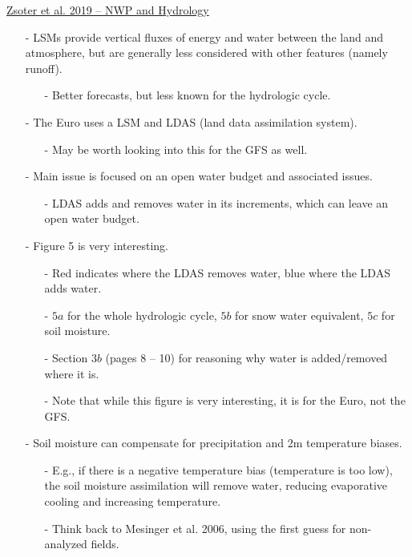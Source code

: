 \documentclass[12pt, letterpaper]{article}
\begin{document}
    \underline{Zsoter et al. 2019 -- NWP and Hydrology}
    \begin{itemize}
    	\item[-] LSMs provide vertical fluxes of energy and water between the land and atmosphere,
    	         but are generally less considered with other features (namely runoff).
    	\begin{itemize}
    		\item[-] Better forecasts, but less known for the hydrologic cycle.
    	\end{itemize}
        \item[-] The Euro uses a LSM and LDAS (land data assimilation system).
        \begin{itemize}
        	\item[-] May be worth looking into this for the GFS as well.
        \end{itemize}
        \item[-] Main issue is focused on an open water budget and associated issues.
        \begin{itemize}
        	\item[-] LDAS adds and removes water in its increments, which can leave an open water budget.
        \end{itemize}
        \item[-] Figure 5 is very interesting.
        \begin{itemize}
        	\item[-] Red indicates where the LDAS removes water, blue where the LDAS adds water.
        	\item[-] $5a$ for the whole hydrologic cycle, $5b$ for snow water equivalent, $5c$ for soil
        	         moisture.
        	\item[-] Section $3b$ (pages 8 -- 10) for reasoning why water is added/removed where it is.
        	\item[-] Note that while this figure is very interesting, it is for the Euro, not the GFS.
        \end{itemize}
        \item[-] Soil moisture can compensate for precipitation and 2m temperature biases.
        \begin{itemize}
        	\item[-] E.g., if there is a negative temperature bias (temperature is too low), the soil
        	         moisture assimilation will remove water, reducing evaporative cooling and increasing
        	         temperature.
            \item[-] Think back to Mesinger et al. 2006, using the first guess for non-analyzed fields.

\end{itemize}
\end{itemize}
\end{document}
